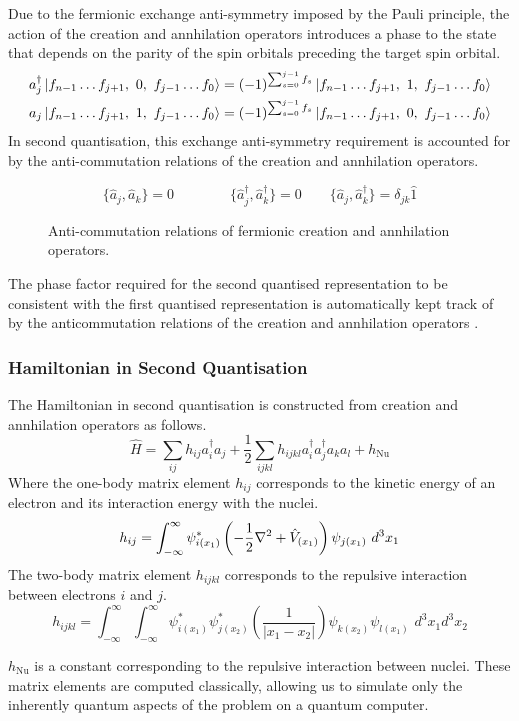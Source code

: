 
Due to the fermionic exchange anti-symmetry imposed by the Pauli principle, the action of the creation and annhilation operators introduces a phase to the state that depends on the parity of the spin orbitals preceding the target spin orbital.
\begin{align*}
    a_j^\dagger \ket{f_{n-1} \dots
    f_{j+1},\,\, 0,\,\, f_{j-1} \dots f_0} &=
    (-1)^{\sum_{s=0}^{j-1} f_s}
    \ket{f_{n-1} \dots f_{j+1},\,\, 1,\,\, f_{j-1} \dots f_0} \\
    a_j \ket{f_{n-1} \dots f_{j+1},\,\, 1,\,\, f_{j-1} \dots f_0} &=
    (-1)^{\sum_{s=0}^{j-1} f_s}
    \ket{f_{n-1} \dots f_{j+1},\,\, 0,\,\, f_{j-1} \dots f_0}
\end{align*}
In second quantisation, this exchange anti-symmetry requirement is accounted for by the anti-commutation relations of the creation and annhilation operators.
\begin{figure}[H]
\begin{equation*}
    \{ \hat a_{j}, \hat a_{k} \} = 0 \qquad \qquad
    \{ \hat a_{j}^{\dagger}, \hat a_{k}^{\dagger} \} = 0 \qquad
    \{ \hat a_{j}, \hat a_{k}^{\dagger} \} = \delta_{jk} \hat{1}
\end{equation*}
\caption{Anti-commutation relations of fermionic creation and annhilation operators.}
\end{figure}
The phase factor required for the second quantised representation to be consistent with the first quantised representation is automatically kept track of by the anticommutation relations of the creation and annhilation operators \cite{Helgaker2000}.

\subsubsection{Hamiltonian in Second Quantisation}
The Hamiltonian in second quantisation is constructed from creation and annhilation operators as follows.
\begin{equation*}
    \hat H =
    \sum_{ij} h_{ij} a^\dagger_i a_j +
    \frac{1}{2} \sum_{ijkl} h_{ijkl} a^\dagger_i a^\dagger_j a_k a_l +
    h_\text{Nu}
\end{equation*}
Where the one-body matrix element $h_{ij}$ corresponds to the kinetic energy of an electron and its interaction energy with the nuclei.
\begin{equation*}
h_{ij} = \int^\infty_{-\infty} \psi^*_{i(x_1)} \left( - \frac{1}{2} \nabla^2 + \hat V_{(x_1)} \right) \psi_{j(x_1)} \,\, d^3 x_1 \\
\end{equation*}
The two-body matrix element $h_{ijkl}$ corresponds to the repulsive interaction between electrons $i$ and $j$.
\begin{equation*}
h_{ijkl} = \int^\infty_{-\infty} \int^\infty_{-\infty} \psi^*_{i(x_1)} \psi^*_{j(x_2)} \left( \frac{1}{|x_1 - x_2|} \right) \psi_{k(x_2)} \psi_{l(x_1)} \,\, d^3 x_1 d^3 x_2
\end{equation*}

$h_\text{Nu}$ is a constant corresponding to the repulsive interaction between nuclei. These matrix elements are computed classically, allowing us to simulate only the inherently quantum aspects of the problem on a quantum computer.

